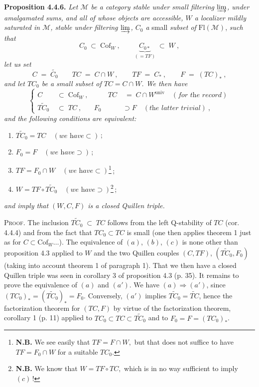 \documentclass[11pt]{article}
\newcommand{\printedpage}[1]{\marginpar{\footnotesize p.~#1}}
\newcommand{\msp}[1]{\marginpar{\footnotesize [#1]}}
\newcommand{\Fl}{\mathrm{Fl}}
\newcommand{\Cof}{\mathrm{Cof}}
\newcommand{\univ}{\mathrm{univ}}
\begin{document}
\textbf{Proposition 4.4.6.} \textit{Let $\mathcal{M}$ be a category stable under small filtering $\varinjlim$, under amalgamated sums, and all of whose objects are accessible, $W$ a localizer}
\msp{page 42}
\textit{mildly saturated in $\mathcal{M}$, stable under filtering $\varinjlim$, $C_0$ a} small \textit{subset of} $\Fl(\mathcal{M})$, \textit{such that}
\[
C_0\;\subset\;\Cof_W\ ,\qquad \underbrace{C_{0*}}_{(=TF)}\;\subset\;W\ ,
\]
\printedpage{28}
\textit{let us set}
\[
C\;=\;\widetilde{C_0}\qquad TC\;=\;C\cap W\ ,\qquad TF\;=\;C_*\ ,\qquad F\;=\;(TC)_*\ ,
\]
\textit{and let $TC_0$ be a small subset of $TC=C\cap W$. We then have}
\[
\left\{
\begin{aligned}
C &\;\subset\;\Cof_W\ , &\qquad TC &\;=\;C\cap W^{\univ}\quad(\textit{for the record})\\
\widetilde{TC_0} &\;\subset\;TC\ , & F_0 &\supset F\quad(\textit{the latter trivial})\ ,
\end{aligned}
\right.
\tag*{(4.4.6)}
\]
\textit{and the following conditions are equivalent:}
\begin{enumerate}[leftmargin=*]
\item[a)] $\widetilde{TC_0}=TC\quad(\textit{we have}\subset)$\,;
\item[a$'$)] $F_0=F\quad(\textit{we have}\supset)$\,;
\item[b)] $TF=F_0\cap W\quad(\textit{we have}\subset)$\footnote[14]{\textbf{N.B.} We see easily that $\boxed{TF=F\cap W,}$ but that does not suffice to have $TF=F_0\cap W$ for a suitable $TC_0$.}\,;
\item[c)] $W=TF\circ\widetilde{TC_0}\quad(\textit{we have}\supset)$\footnote[15]{\textbf{N.B.} We know that $\boxed{W=TF\circ TC,}$ which is in no way sufficient to imply $(c)$\,!}\,;
\end{enumerate}
\textit{and imply that $(W,C,F)$ is a closed Quillen triple.}

\textsc{Proof.} The inclusion $\widetilde{TC_0}\;\subset\;TC$ follows from the left Q-stability of $TC$ (cor. 4.4.4) and from the fact that $TC_0\subset TC$ is small (one then applies theorem 1 just as for $C\subset\Cof_W\ldots$). The equivalence of $(a)$, $(b)$, $(c)$ is none other than proposition 4.3 applied to $W$ and the two Quillen couples $(C,TF)$, $(\widetilde{TC_0},F_0)$ (taking into account theorem 1 of paragraph 1). That we then have a closed Quillen triple was seen in corollary 3 of proposition 4.3 (p. 35). It remains to prove the equivalence of $(a)$ and $(a')$. We have $(a)\Longrightarrow(a')$, since $(TC_0)_*=(\widetilde{TC_0})_*=F_0$. Conversely, $(a')$ implies $\widetilde{TC_0}=\widetilde{TC}$, hence the factorization theorem for $(TC,F)$ by virtue of the factorization theorem, corollary 1 (p. 11) applied to $TC_0\subset TC\subset\widetilde{TC_0}$ and to $F_0=F=(TC_0)_*$.
\end{document}
